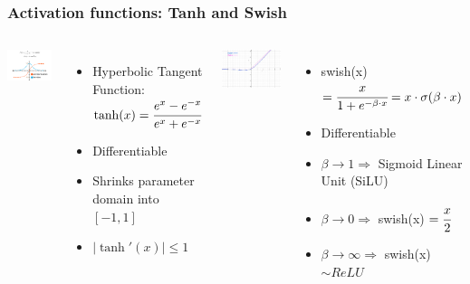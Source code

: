 \documentclass[12pt, aspectratio = 169]{beamer}
\begin{document}

\begin{frame}[t]
	\frametitle{Activation functions: Tanh and Swish}
	\vspace{0.5em}
	\begin{columns}[T]
		\begin{minipage}[T]{\linewidth}
			\centering
				\vspace{-1em}\includegraphics[width=0.6\linewidth]{tanh_and_tanh_der.png}\\
			\begin{itemize}
		    	\item Hyperbolic Tangent Function: $\tanh(x) = \cfrac{e^{x} - e^{-x}}{e^{x} + e^{-x}}$
				\item Differentiable
				\item Shrinks parameter domain into $[-1,1]$
				\item $|\tanh'(x)| \leq 1$
			\end{itemize}%
		\end{minipage}%
		\begin{minipage}[T]{\linewidth}
			\centering
			\vspace{-1em}\includegraphics[width=0.5\linewidth]{swish.png}\\
			\begin{itemize}
		    	\item swish(x) $= \cfrac{x}{1+e^{-\beta \cdot x}} = x \cdot \sigma(\beta \cdot x)$
				\item Differentiable
				\item $\beta \rightarrow 1 \Rightarrow$ Sigmoid Linear Unit (SiLU)
				\item $\beta \rightarrow 0 \Rightarrow$ swish(x) $= \cfrac{x}{2}$
				\item $\beta \rightarrow \infty \Rightarrow$ swish(x) $\sim ReLU$
			\end{itemize}
		\end{minipage}
	\end{columns}
\end{frame}
\end{document}
